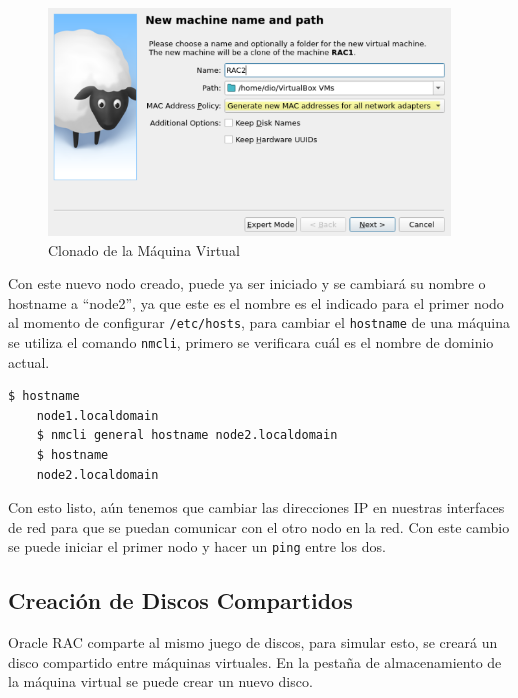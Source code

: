 \documentclass{article}
\begin{document}
\begin{figure}[H]
	\begin{center}
		\includegraphics[width=0.95\textwidth]{vm_clone.png}
	\end{center}
	\caption{Clonado de la Máquina Virtual}
\end{figure}

Con este nuevo nodo creado, puede ya ser iniciado y se cambiará su nombre o hostname a ``node2'', ya que este es el nombre es el indicado para el primer nodo al momento de configurar \texttt{/etc/hosts}, para cambiar el \texttt{hostname} de una máquina se utiliza el comando \texttt{nmcli}, primero se verificara cuál es el nombre de dominio actual.

\begin{lstlisting}[style=mystyle,language=bash]
	$ hostname
	node1.localdomain
	$ nmcli general hostname node2.localdomain
	$ hostname
	node2.localdomain
\end{lstlisting}

Con esto listo, aún tenemos que cambiar las direcciones IP en nuestras interfaces de red para que se puedan comunicar con el otro nodo en la red. Con este cambio se puede iniciar el primer nodo y hacer un \texttt{ping} entre los dos.

\subsection{Creación de Discos Compartidos}

Oracle RAC comparte al mismo juego de discos, para simular esto, se creará un disco compartido entre máquinas virtuales. En la pestaña de almacenamiento de la máquina virtual se puede crear un nuevo disco.
\end{document}
